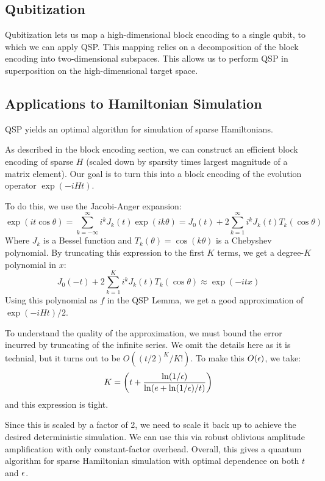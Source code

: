 \subsection*{Qubitization}
Qubitization lets us map a high-dimensional block encoding to a single qubit, to which we can apply QSP. This mapping relies on a decomposition of the block encoding into two-dimensional subspaces. This allows us to perform QSP in superposition on the high-dimensional target space.

\subsection*{Applications to Hamiltonian Simulation}
QSP yields an optimal algorithm for simulation of sparse Hamiltonians.

As described in the block encoding section, we can construct an efficient block encoding of sparse $H$ (scaled down by sparsity times largest magnitude of a matrix element). Our goal is to turn this into a block encoding of the evolution operator $\exp(-iHt)$. 

To do this, we use the Jacobi-Anger expansion:
\begin{equation}
    \exp(it\cos\theta) = \sum_{k=-\infty}^\infty i^kJ_k(t)\exp(ik\theta) = J_0(t) + 2\sum_{k=1}^\infty i^k J_k(t)T_k(\cos\theta)
\end{equation}
Where $J_k$ is a Bessel function and $T_k(\theta) = \cos(k\theta)$ is a Chebyshev polynomial. By truncating this expression to the first $K$ terms, we get a degree-$K$ polynomial in $x$:
\begin{equation}
    J_0(-t) + 2\sum_{k=1}^K i^k J_k(t)T_k(\cos\theta) \approx \exp(-itx)
\end{equation}
Using this polynomial as $f$ in the QSP Lemma, we get a good approximation of $\exp(-iHt)/2$. 

To understand the quality of the approximation, we must bound the error incurred by truncating of the infinite series. We omit the details here as it is technial, but it turns out to be $O((t/2)^K/K!)$. To make this $O(\epsilon)$, we take:
\begin{equation}
    K = \left(t + \frac{\ln(1/\epsilon)}{\ln(e + \ln(1/\epsilon)/t)}\right)
\end{equation}
and this expression is tight.

Since this is scaled by a factor of 2, we need to scale it back up to achieve the desired deterministic simulation. We can use this via robust oblivious amplitude amplification with only constant-factor overhead. Overall, this gives a quantum algorithm for sparse Hamiltonian simulation with optimal dependence on both $t$ and $\epsilon$. 